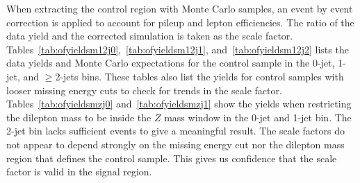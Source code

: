 When extracting the control region with Monte Carlo samples, an event by event correction is applied to
account for pileup and lepton efficiencies. The ratio of the data yield and the corrected simulation is taken as the scale
factor. Tables~\ref{tab:ofyieldsm12j0},~\ref{tab:ofyieldsm12j1}, and~\ref{tab:ofyieldsm12j2} lists the data yields and Monte Carlo
expectations for the control sample in the 0-jet, 1-jet, and $\geq$2-jets bins. These tables also list the yields for control samples
with looser missing energy cuts to check for trends in the scale factor. Tables~\ref{tab:ofyieldsmzj0} and~\ref{tab:ofyieldsmzj1}
show the yields when restricting the dilepton mass to be inside the $Z$ mass window in the 0-jet and 1-jet bin. The 2-jet bin lacks
sufficient events to give a meaningful result. The scale factors do not appear to depend strongly on the missing energy cut nor the
dilepton mass region that defines the control sample. This gives us confidence that the scale factor is valid in the signal region.


